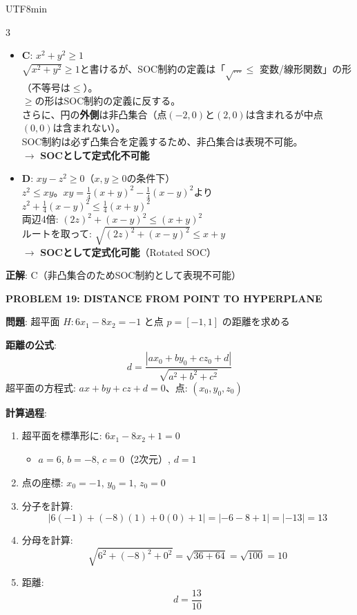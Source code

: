 \documentclass[8pt,a4paper]{article}
\newcommand{\mysection}[1]{\vspace{2pt}\textbf{#1}\vspace{1pt}}
\begin{document}
\begin{CJK}{UTF8}{min}
\begin{multicols}{3}
\begin{itemize}
    \item \textbf{C}: $x^2+y^2 \geq 1$\\
    $\sqrt{x^2+y^2} \geq 1$と書けるが、SOC制約の定義は「$\sqrt{...} \leq$ 変数/線形関数」の形（不等号は$\leq$）。\\
    $\geq$の形はSOC制約の定義に反する。\\
    さらに、円の\textbf{外側}は非凸集合（点$(-2,0)$と$(2,0)$は含まれるが中点$(0,0)$は含まれない）。\\
    SOC制約は必ず凸集合を定義するため、非凸集合は表現不可能。\\
    $\to$ \textbf{SOCとして定式化不可能}
    
    \item \textbf{D}: $xy-z^2 \geq 0$（$x,y \geq 0$の条件下）\\
    $z^2 \leq xy$。$xy = \frac{1}{4}(x+y)^2 - \frac{1}{4}(x-y)^2$より\\
    $z^2 + \frac{1}{4}(x-y)^2 \leq \frac{1}{4}(x+y)^2$\\
    両辺4倍: $(2z)^2 + (x-y)^2 \leq (x+y)^2$\\
    ルートを取って: $\sqrt{(2z)^2 + (x-y)^2} \leq x+y$\\
    $\to$ \textbf{SOCとして定式化可能}（Rotated SOC）
\end{itemize}

\textbf{正解}: C（非凸集合のためSOC制約として表現不可能）

\mysection{PROBLEM 19: DISTANCE FROM POINT TO HYPERPLANE}

\textbf{問題}: 超平面 $H: 6x_1 - 8x_2 = -1$ と点 $p = [-1, 1]$ の距離を求める

\textbf{距離の公式}:
\[
d = \frac{|ax_0 + by_0 + cz_0 + d|}{\sqrt{a^2 + b^2 + c^2}}
\]
超平面の方程式: $ax + by + cz + d = 0$、点: $(x_0, y_0, z_0)$

\textbf{計算過程}:
\begin{enumerate}
    \item 超平面を標準形に: $6x_1 - 8x_2 + 1 = 0$
    \begin{itemize}
        \item $a = 6$, $b = -8$, $c = 0$（2次元）, $d = 1$
    \end{itemize}
    \item 点の座標: $x_0 = -1$, $y_0 = 1$, $z_0 = 0$
    \item 分子を計算:
    \[
    |6(-1) + (-8)(1) + 0(0) + 1| = |-6 - 8 + 1| = |-13| = 13
    \]
    \item 分母を計算:
    \[
    \sqrt{6^2 + (-8)^2 + 0^2} = \sqrt{36 + 64} = \sqrt{100} = 10
    \]
    \item 距離:
    \[
    d = \frac{13}{10}
    \]
\end{enumerate}


\end{multicols}
\end{CJK}
\end{document}
